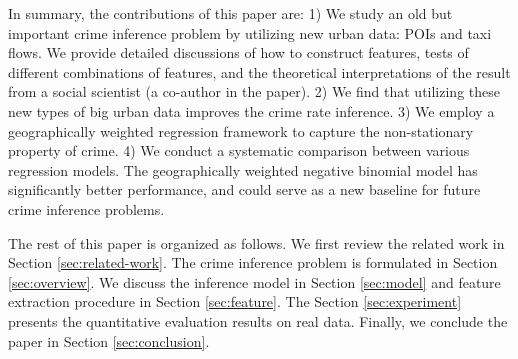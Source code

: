 In summary, the contributions of this paper are:  1) We study an old but important crime inference problem by utilizing new urban data: POIs and taxi flows. We provide detailed discussions of how to construct features, tests of different combinations of features, and the theoretical interpretations of the result from a social scientist (a co-author in the paper). 2) We find that utilizing these new types of big urban data improves the crime rate inference. 3) We employ a geographically weighted regression framework to capture the non-stationary property of crime. 4) We conduct a systematic comparison between various regression models. The geographically weighted negative binomial model has significantly better performance, and could serve as a new baseline for future crime inference problems.

The rest of this paper is organized as follows. We first review the related work in Section \ref{sec:related-work}. The crime inference problem is formulated in Section \ref{sec:overview}. We discuss the inference model in Section \ref{sec:model} and feature extraction procedure in Section \ref{sec:feature}. The Section \ref{sec:experiment} presents the quantitative evaluation results on real data. Finally, we conclude the paper in Section \ref{sec:conclusion}.

